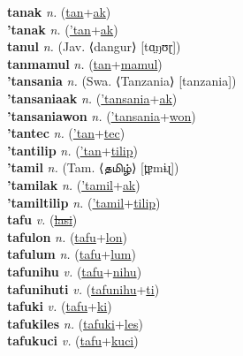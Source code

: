 \textbf{tanak} \textit{n.} (\hyperref[tan]{tan}+\hyperref[ak]{ak})
 \label{tanak} \\
\textbf{'tanak} \textit{n.} (\hyperref['tan]{'tan}+\hyperref[ak]{ak})
 \label{'tanak} \\
\textbf{tanul} \textit{n.} (Jav. ⟨dangur⟩ [tɑ̤ŋʊɽ])
 \label{tanul} \\
\textbf{tanmamul} \textit{n.} (\hyperref[tan]{tan}+\hyperref[mamul]{mamul})
 \label{tanmamul} \\
\textbf{'tansania} \textit{n.} (Swa. ⟨Tanzania⟩ [tanzania])
 \label{'tansania} \\
\textbf{'tansaniaak} \textit{n.} (\hyperref['tansania]{'tansania}+\hyperref[ak]{ak})
 \label{'tansaniaak} \\
\textbf{'tansaniawon} \textit{n.} (\hyperref['tansania]{'tansania}+\hyperref[won]{won})
 \label{'tansaniawon} \\
\textbf{'tantec} \textit{n.} (\hyperref['tan]{'tan}+\hyperref[tec]{tec})
 \label{'tantec} \\
\textbf{'tantilip} \textit{n.} (\hyperref['tan]{'tan}+\hyperref[tilip]{tilip})
 \label{'tantilip} \\
\textbf{'tamil} \textit{n.} (Tam. ⟨தமிழ்⟩ [t̪ɐmɨɻ])
 \label{'tamil} \\
\textbf{'tamilak} \textit{n.} (\hyperref['tamil]{'tamil}+\hyperref[ak]{ak})
 \label{'tamilak} \\
\textbf{'tamiltilip} \textit{n.} (\hyperref['tamil]{'tamil}+\hyperref[tilip]{tilip})
 \label{'tamiltilip} \\
\textbf{tafu} \textit{v.} (\hyperref[lasi]{\sout{lasi}})
 \label{tafu} \\
\textbf{tafulon} \textit{n.} (\hyperref[tafu]{tafu}+\hyperref[lon]{lon})
 \label{tafulon} \\
\textbf{tafulum} \textit{n.} (\hyperref[tafu]{tafu}+\hyperref[lum]{lum})
 \label{tafulum} \\
\textbf{tafunihu} \textit{v.} (\hyperref[tafu]{tafu}+\hyperref[nihu]{nihu})
 \label{tafunihu} \\
\textbf{tafunihuti} \textit{v.} (\hyperref[tafunihu]{tafunihu}+\hyperref[ti]{ti})
 \label{tafunihuti} \\
\textbf{tafuki} \textit{v.} (\hyperref[tafu]{tafu}+\hyperref[ki]{ki})
 \label{tafuki} \\
\textbf{tafukiles} \textit{n.} (\hyperref[tafuki]{tafuki}+\hyperref[les]{les})
 \label{tafukiles} \\
\textbf{tafukuci} \textit{v.} (\hyperref[tafu]{tafu}+\hyperref[kuci]{kuci})
